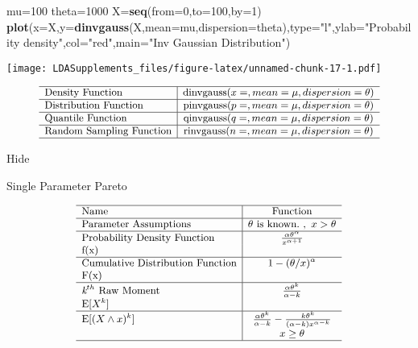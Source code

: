 \documentclass[]{book}
\newenvironment{Shaded}{\begin{snugshade}}{\end{snugshade}}
\newcommand{\KeywordTok}[1]{\textcolor[rgb]{0.13,0.29,0.53}{\textbf{#1}}}
\newcommand{\DataTypeTok}[1]{\textcolor[rgb]{0.13,0.29,0.53}{#1}}
\newcommand{\DecValTok}[1]{\textcolor[rgb]{0.00,0.00,0.81}{#1}}
\newcommand{\StringTok}[1]{\textcolor[rgb]{0.31,0.60,0.02}{#1}}
\newcommand{\NormalTok}[1]{#1}
\begin{document}
\begin{Shaded}
\begin{Highlighting}[]
\NormalTok{mu=}\DecValTok{100}
\NormalTok{theta=}\DecValTok{1000}
\NormalTok{X=}\KeywordTok{seq}\NormalTok{(}\DataTypeTok{from=}\DecValTok{0}\NormalTok{,}\DataTypeTok{to=}\DecValTok{100}\NormalTok{,}\DataTypeTok{by=}\DecValTok{1}\NormalTok{)}
\KeywordTok{plot}\NormalTok{(}\DataTypeTok{x=}\NormalTok{X,}\DataTypeTok{y=}\KeywordTok{dinvgauss}\NormalTok{(X,}\DataTypeTok{mean=}\NormalTok{mu,}\DataTypeTok{dispersion=}\NormalTok{theta),}\DataTypeTok{type=}\StringTok{"l"}\NormalTok{,}\DataTypeTok{ylab=}\StringTok{"Probability density"}\NormalTok{,}\DataTypeTok{col=}\StringTok{"red"}\NormalTok{,}\DataTypeTok{main=}\StringTok{"Inv Gaussian Distribution"}\NormalTok{)}
\end{Highlighting}
\end{Shaded}

\texttt{[image: LDASupplements\_files/figure-latex/unnamed-chunk-17-1.pdf]}

\[
{\small
\begin{matrix}
\begin{array}{l|c}
\hline
  \text{Density Function} & \text{dinvgauss}(x=, mean=\mu,dispersion=\theta) \\
\hline
  \text{Distribution Function} & \text{pinvgauss}(p=, mean=\mu,dispersion=\theta) \\
\hline
  \text{Quantile Function} & \text{qinvgauss}(q=, mean=\mu,dispersion=\theta) \\ 
\hline
  \text{Random Sampling Function} & \text{rinvgauss}(n=, mean=\mu,dispersion=\theta) \\
\hline
\end{array}
\end{matrix}
}
\]

\hypertarget{odC}{}
{Hide}

Single Parameter Pareto

\[
{\small
\begin{matrix}
\begin{array}{l|c}
\hline
  \text{Name} & \text{Function} \\
\hline
  \text{Parameter Assumptions} & \theta~\text{is known.}~,~x>\theta \\
\hline
  \text{Probability Density Function} & \frac{\alpha\theta^\alpha}{x^{\alpha+1}} \\
    \text{f(x)} & \\
\hline
  \text{Cumulative Distribution Function} & 1-(\theta/x)^\alpha \\
    \text{F(x)} & \\
\hline
  \textit{k}^{th}~\text{Raw Moment} & \frac{\alpha\theta^k}{\alpha-k} \\
  \mathrm{E}[X^k]  & \\
\hline
  \mathrm{E}[(X\wedge x)^k] & \frac{\alpha\theta^k}{\alpha-k}-\frac{k\theta^k}{(\alpha-k)x^{\alpha-k}} \\
  & x \geq\theta \\
\hline
\end{array}
\end{matrix}
}
\]
\end{document}

